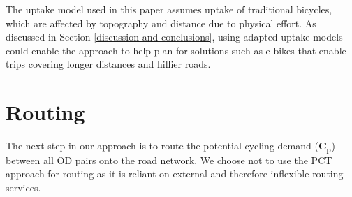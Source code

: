 \documentclass[
]{article}
\begin{document}
The uptake model used in this paper assumes uptake of traditional bicycles,
which are affected by topography and distance due to physical effort.
As discussed in Section \ref{discussion-and-conclusions}, using adapted uptake
models could enable the approach to help plan for solutions such as e-bikes
that enable trips covering longer distances and hillier roads.

\hypertarget{routing}{%
\section{Routing}\label{routing}}

The next step in our approach is to route the potential cycling demand
(\(\boldsymbol{C_{p}}\)) between all OD pairs onto the road network. We
choose not to use the PCT approach for routing as it is reliant on
external and therefore inflexible routing services.
\end{document}
